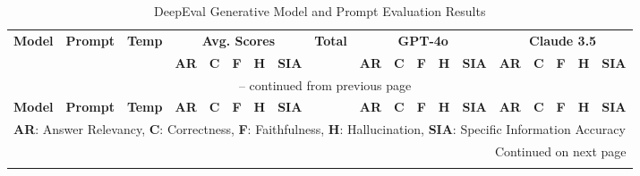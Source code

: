 \clearpage
{}
\pagestyle{empty}
\begin{landscape}
    \small
    \setlength{\tabcolsep}{3pt}       %
    \renewcommand{\arraystretch}{0.9}  %
    \setlength{\LTleft}{0pt}          %
    \setlength{\LTright}{0pt}         %
    \begin{longtable}{|l|c|c|ccccc|c|ccccc|ccccc|}
        \caption{DeepEval Generative Model and Prompt Evaluation Results}
        \label{tab:deepeval_results} \\

        \toprule
        \textbf{Model} & \textbf{Prompt} & \textbf{Temp} & \multicolumn{5}{c|}{\textbf{Avg. Scores}} & \textbf{Total} & \multicolumn{5}{c|}{\textbf{GPT-4o}} & \multicolumn{5}{c|}{\textbf{Claude 3.5}} \\
        & & & \textbf{AR} & \textbf{C} & \textbf{F} & \textbf{H} & \textbf{SIA} & & \textbf{AR} & \textbf{C} & \textbf{F} & \textbf{H} & \textbf{SIA} & \textbf{AR} & \textbf{C} & \textbf{F} & \textbf{H} & \textbf{SIA} \\
        \midrule
        \endfirsthead

        \multicolumn{19}{c}{\tablename\ \thetable{} -- continued from previous page} \\
        \midrule
        \textbf{Model} & \textbf{Prompt} & \textbf{Temp} & \textbf{AR} & \textbf{C} & \textbf{F} & \textbf{H} & \textbf{SIA} & & \textbf{AR} & \textbf{C} & \textbf{F} & \textbf{H} & \textbf{SIA} & \textbf{AR} & \textbf{C} & \textbf{F} & \textbf{H} & \textbf{SIA} \\
        \midrule
        \endhead

        \midrule
        \multicolumn{19}{l}{\footnotesize{\textbf{AR}: Answer Relevancy, \textbf{C}: Correctness, \textbf{F}: Faithfulness, \textbf{H}: Hallucination, \textbf{SIA}: Specific Information Accuracy}} \\
        \multicolumn{19}{r}{Continued on next page} \\
        \endfoot


\end{longtable}
\end{landscape}
